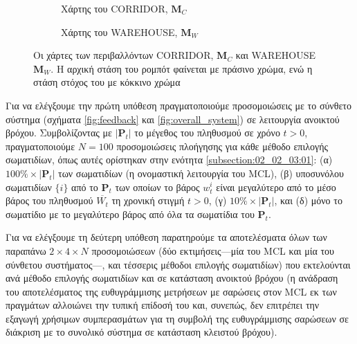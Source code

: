 \begin{figure}\hspace{0.5cm}
  \begin{subfigure}{0.49\linewidth}\centering
    \vspace{1.0cm}
    
    \vspace{1.0cm}
    \caption{\small Χάρτης του CORRIDOR, $\bm{M}_C$}
    \label{fig:02_02_04:map_corridor}
  \end{subfigure}\hfill
  \begin{subfigure}{0.49\linewidth} \centering
    
    \vspace{0.25cm}
    \caption{\small Χάρτης του WAREHOUSE, $\bm{M}_W$}
    \label{fig:02_02_04:map_warehouse}
  \end{subfigure}
  \caption{\small Οι χάρτες των περιβαλλόντων CORRIDOR, $\bm{M}_C$ και
           WAREHOUSE $\bm{M}_W$. Η αρχική στάση του ρομπότ φαίνεται με πράσινο
           χρώμα, ενώ η στάση στόχος του με κόκκινο χρώμα}
\label{fig:02_02_04:maps}
\end{figure}

Για να ελέγξουμε την πρώτη υπόθεση πραγματοποιούμε προσομοιώσεις με το σύνθετο
σύστημα (σχήματα \ref{fig:feedback} και \ref{fig:overall_system}) σε
λειτουργία ανοικτού βρόχου. Συμβολίζοντας με $|\bm{P}_t|$ το μέγεθος του
πληθυσμού σε χρόνο $t>0$, πραγματοποιούμε $N=100$ προσομοιώσεις πλοήγησης για
κάθε μέθοδο επιλογής σωματιδίων, όπως αυτές ορίστηκαν στην ενότητα
\ref{subsection:02_02_03:01}: (α) $100\% \times |\bm{P}_t|$ των σωματιδίων (η
ονομαστική λειτουργία του MCL), (β) υποσυνόλου σωματιδίων $\{i\}$ από το
$\bm{P}_t$ των οποίων το βάρος $w_t^i$ είναι μεγαλύτερο από το μέσο βάρος του
πληθυσμού $\overline{W_t}$ τη χρονική στιγμή $t>0$, (γ) $10\% \times
|\bm{P}_t|$, και (δ) μόνο το σωματίδιο με το μεγαλύτερο βάρος από όλα τα
σωματίδια του $\bm{P}_t$.

Για να ελέγξουμε τη δεύτερη υπόθεση παρατηρούμε τα αποτελέσματα όλων των
παραπάνω $2\times4\times N$ προσομοιώσεων (δύο εκτιμήσεις---μία του MCL και μία
του σύνθετου συστήματος---, και τέσσερις μέθοδοι επιλογής σωματιδίων) που
εκτελούνται ανά μέθοδο επιλογής σωματιδίων και σε κατάσταση ανοικτού βρόχου (η
ανάδραση του αποτελέσματος της ευθυγράμμισης μετρήσεων με σαρώσεις στον MCL εκ
των πραγμάτων αλλοιώνει την τυπική επίδοσή του και, συνεπώς, δεν επιτρέπει την
εξαγωγή χρήσιμων συμπερασμάτων για τη συμβολή της ευθυγράμμισης σαρώσεων σε
διάκριση με το συνολικό σύστημα σε κατάσταση κλειστού βρόχου).


